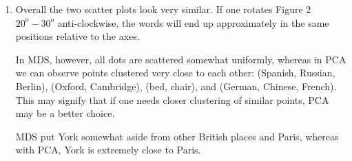 \documentclass{article}
\begin{document}
\begin{enumerate}
\item
Overall the two scatter plots look very similar. If one rotates Figure 2 $20^o-30^o$ anti-clockwise, the words will end up approximately in the same positions relative to the axes.

In MDS, however, all dots are scattered somewhat uniformly, whereas in PCA we can observe points clustered very close to each other: (Spanish, Russian, Berlin), (Oxford, Cambridge), (bed, chair), and (German, Chinese, French). This may signify that if one needs closer clustering of similar points, PCA may be a better choice.

MDS put York somewhat aside from other British places and Paris, whereas with PCA, York is extremely close to Paris.

\end{enumerate}
\end{document}
